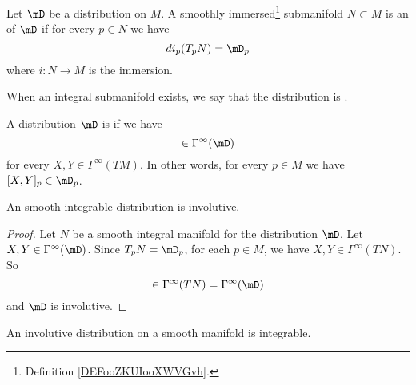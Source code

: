 \begin{definition}
	Let \( \mD\) be a distribution on \( M\). A smoothly immersed\footnote{Definition \ref{DEFooZKUIooXWVGvh}.} submanifold \( N\subset M\) is an  of \( \mD\) if for every \( p\in N\) we have
	\begin{equation}
		di_p(T_pN)=\mD_p
	\end{equation}
	where \( i\colon N\to M\) is the immersion.

	When an integral submanifold exists, we say that the distribution is .
\end{definition}

\begin{definition}
	A distribution \( \mD\) is  if we have
	\begin{equation}
		[X,Y]\in \Gamma^{\infty}(\mD)
	\end{equation}
	for every \( X,Y\in \Gamma^{\infty}(TM)\). In other words, for every \( p\in M\) we have \( [X,Y]_p\in \mD_p\).
\end{definition}

\begin{proposition}     \label{PROPooDYJNooAwnaFK}
	An smooth integrable distribution is involutive.
\end{proposition}

\begin{proof}
	Let \( N\) be a smooth integral manifold for the distribution \( \mD\).  Let \( X,Y\in\Gamma^{\infty}(\mD)\). Since \( T_pN=\mD_p\), for each \( p\in M\), we have \( X,Y\in\Gamma^{\infty}(TN)\). So
	\begin{equation}
		[X,Y]\in\Gamma^{\infty}(TN)=\Gamma^{\infty}(\mD)
	\end{equation}
	and \( \mD\) is involutive.
\end{proof}

\begin{theorem}        \label{THOooDVBHooGRhuGl}
	An involutive distribution on a smooth manifold is integrable.
\end{theorem}


